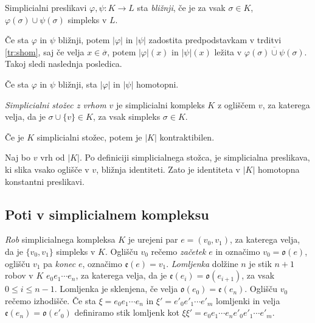 \documentclass[mat1]{fmfdelo}
\begin{document}
\begin{definicija}
    Simplicialni preslikavi $\varphi, \psi\colon K\rightarrow L$ sta \emph{bližnji}, če je za vsak $\sigma \in K$, $\varphi(\sigma)\cup \psi(\sigma)$ simpleks v $L$.
\end{definicija}

Če sta $\varphi$ in $\psi$ bližnji, potem $|\varphi|$ in $|\psi|$ zadostita predpodstavkam v trditvi \ref{tr:shom}, saj če velja $x\in \overline{\sigma}$, potem $|\varphi|(x)$ in $|\psi|(x)$ ležita v $\overline{\varphi(\sigma)\cup\psi(\sigma)}$. Takoj sledi naslednja posledica.

\begin{posledica}
    Če sta $\varphi$ in $\psi$ bližnji, sta $|\varphi|$ in $|\psi|$ homotopni.
\end{posledica}

\emph{Simplicialni stožec z vrhom $v$} je simplicialni kompleks $K$ z ogliščem $v$, za katerega velja, da je $\sigma \cup \{v\} \in K$, za vsak simpleks $\sigma\in K$.

\begin{posledica}
    Če je $K$ simplicialni stožec, potem je $|K|$ kontraktibilen.
    \label{pos:kontr}
\end{posledica}

\begin{dokaz}
    Naj bo $v$ vrh od $|K|$. Po definiciji simplicialnega stožca, je simplicialna preslikava, ki slika vsako oglišče v $v$, bližnja identiteti. Zato je identiteta v $|K|$ homotopna konstantni preslikavi.
\end{dokaz}

\subsection{Poti v simplicialnem kompleksu}

\emph{Rob} simplicialnega kompleksa $K$ je urejeni par $e=(v_0,v_1)$, za katerega velja, da je $\{v_0,v_1\}$ simpleks v $K$. Oglišču $v_0$ rečemo \emph{začetek} $e$ in označimo 
$v_0=\mathfrak{o}(e)$, oglišču $v_1$ pa \emph{konec} $e$, 
označimo $\mathfrak{e}(e)=v_1$. \emph{Lomljenka} dolžine $n$ je stik $n+1$ robov v $K$ $e_0e_1 \cdots e_{n}$, za katerega velja, da je $\mathfrak{e}(e_i)=\mathfrak{o}(e_{i+1})$, za vsak $0\leq i \leq n-1$.
Lomljenka je sklenjena, če velja $\mathfrak{o}(e_0)=\mathfrak{e}(e_n)$. Oglišču $v_0$ rečemo izhodišče. Če sta $\xi =e_0e_1 \cdots e_n$ in $\xi'=e'_0e'_1 \cdots e'_{m}$ lomljenki in velja $\mathfrak{e}(e_n)=\mathfrak{o}(e'_0)$ definiramo stik lomljenk kot $\xi\xi'=e_0e_1 \cdots e_{n}e'_0e'_1 \cdots e'_{m}$.
\end{document}
